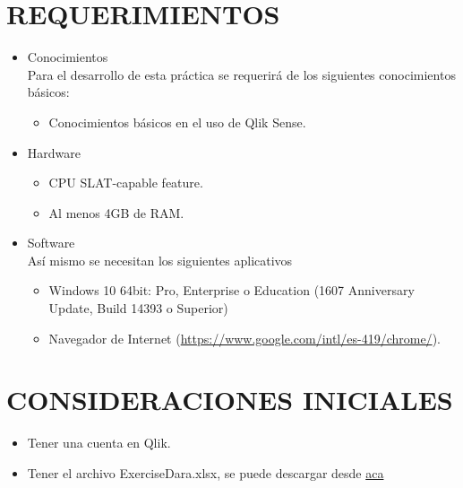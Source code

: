 \documentclass[12pt,letterpaper]{article}
\begin{document}
    \section{REQUERIMIENTOS}
    \begin{itemize}
        \item Conocimientos\\
        Para el desarrollo de esta práctica se requerirá de los siguientes conocimientos básicos:
        \begin{itemize} 
            \item Conocimientos básicos en el uso de Qlik Sense.
        \end{itemize}
        \item Hardware
        \begin{itemize}
            \item CPU SLAT-capable feature.
            \item Al menos 4GB de RAM.
        \end{itemize}
        \item Software\\
        Así mismo se necesitan los siguientes aplicativos
        \begin{itemize}
            \item Windows 10 64bit: Pro, Enterprise o Education (1607 Anniversary Update, Build 14393 o Superior) 
            \item Navegador de Internet (\textcolor{azul}{\url{https://www.google.com/intl/es-419/chrome/}}).
        \end{itemize}
    \end{itemize}
    \section{CONSIDERACIONES INICIALES}
    \begin{itemize}
        \item Tener una cuenta en Qlik.
        \item Tener el archivo ExerciseDara.xlsx, se puede descargar desde \textcolor{azul}{\href{https://learning.qlik.com/mod/resource/view.php?id=22519}{aca}}
    \end{itemize}
    \newpage
\end{document}
